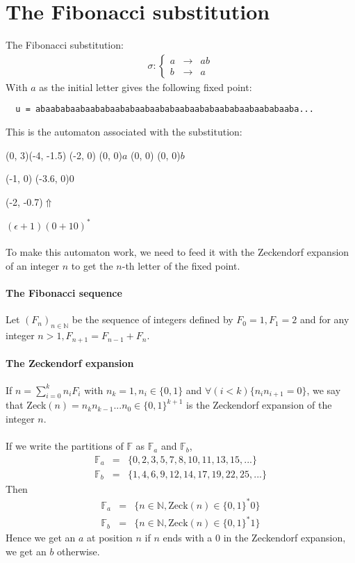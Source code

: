 \documentclass{article}
\begin{document}
\section*{The Fibonacci substitution}
The Fibonacci substitution:
\begin{eqnarray*}
\sigma: \left\{ \begin{array}{lll}
a &\rightarrow& ab\\
b &\rightarrow& a
\end{array} \right.
\end{eqnarray*}
With $a$ as the initial letter gives the following fixed point:
\begin{verbatim}
  u = abaababaabaababaababaabaababaabaababaababaabaababaaba...
\end{verbatim}
This is the automaton associated with the substitution:\\
\begin{graph}(0, 3)(-4, -1.5)
  (-2, 0) (0, 0){$a$}
  (0, 0)  (0, 0){$b$}

  (-1, 0) \freetext(-3.6, 0){0}
   
   

  \freetext(-2, -0.7){$\Uparrow$}
\end{graph} $(\epsilon + 1)(0 + 10)^*$\\
\\
To make this automaton work, we need to feed it with the Zeckendorf expansion
of an integer $n$ to get the $n$-th letter of the fixed point.
\paragraph{The Fibonacci sequence}
Let $(F_n)_{n \in \mathbb{N}}$ be the sequence of integers defined by $F_0 = 1,
F_1 = 2$ and for any integer $n > 1, F_{n + 1} = F_{n - 1} + F_n$.
\paragraph{The Zeckendorf expansion}
If $n = \sum_{i = 0}^k n_i F_i$ with $n_k = 1, n_i \in \{0, 1\}$ and
$\forall (i < k) \{n_i n_{i + 1} = 0\}$, we say that
Zeck$(n) = n_k n_{k - 1} ... n_0 \in \{0, 1\}^{k + 1}$ is the Zeckendorf
expansion of the integer $n$.\\
\\
If we write the partitions of
$\mathbb{F}$ as $\mathbb{F}_a$ and $\mathbb{F}_b$,
\begin{eqnarray*}
  \mathbb{F}_a &=& \{0, 2, 3, 5, 7, 8, 10, 11, 13, 15, ...\}\\
  \mathbb{F}_b &=& \{1, 4, 6, 9, 12, 14, 17, 19, 22, 25, ...\}
\end{eqnarray*}
Then
\begin{eqnarray*}
  \mathbb{F}_a &=& \{n \in \mathbb{N}, \mathrm{Zeck}(n) \in \{0, 1\}^* 0\}\\
  \mathbb{F}_b &=& \{n \in \mathbb{N}, \mathrm{Zeck}(n) \in \{0, 1\}^* 1\}
\end{eqnarray*}
Hence we get an $a$ at position $n$ if $n$ ends with a 0 in the
Zeckendorf expansion, we get an $b$ otherwise.
\end{document}
